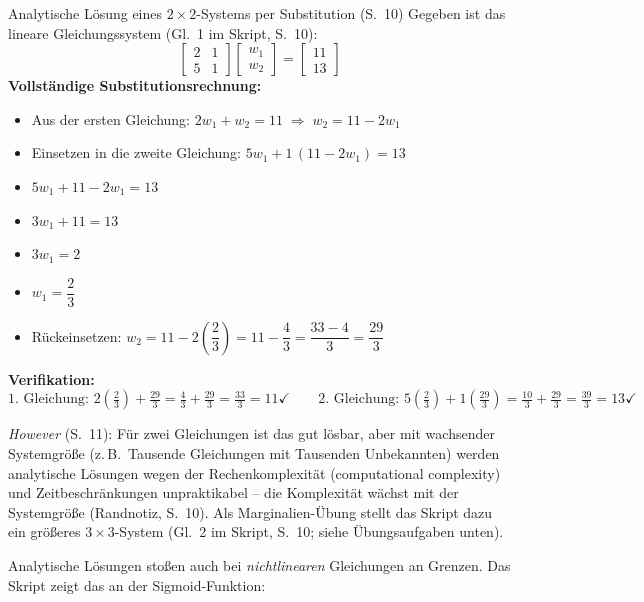 \begin{bspbox}{Analytische Lösung eines $2\times 2$-Systems per Substitution (S.~10)}
Gegeben ist das lineare Gleichungssystem (Gl.~1 im Skript, S.~10):
\[
\begin{bmatrix} 2 & 1 \\ 5 & 1 \end{bmatrix}
\begin{bmatrix} w_1 \\ w_2 \end{bmatrix}
=
\begin{bmatrix} 11 \\ 13 \end{bmatrix}
\]
\textbf{Vollständige Substitutionsrechnung:}
\begin{itemize}[itemsep=0pt]
  \item Aus der ersten Gleichung: $2w_1 + w_2 = 11 \;\Rightarrow\; w_2 = 11 - 2w_1$
  \item Einsetzen in die zweite Gleichung: $5w_1 + 1\,(11 - 2w_1) = 13$
  \item $5w_1 + 11 - 2w_1 = 13$
  \item $3w_1 + 11 = 13$
  \item $3w_1 = 2$
  \item $w_1 = \dfrac{2}{3}$
  \item Rückeinsetzen: $w_2 = 11 - 2\left(\dfrac{2}{3}\right) = 11 - \dfrac{4}{3} = \dfrac{33-4}{3} = \dfrac{29}{3}$
\end{itemize}
\textbf{Verifikation:}
\[
\text{1.\ Gleichung: } 2\left(\tfrac{2}{3}\right) + \tfrac{29}{3} = \tfrac{4}{3} + \tfrac{29}{3} = \tfrac{33}{3} = 11 \checkmark
\qquad
\text{2.\ Gleichung: } 5\left(\tfrac{2}{3}\right) + 1\left(\tfrac{29}{3}\right) = \tfrac{10}{3} + \tfrac{29}{3} = \tfrac{39}{3} = 13 \checkmark
\]
\end{bspbox}

\emph{However} (S.~11): Für zwei Gleichungen ist das gut lösbar, aber mit wachsender Systemgröße (z.\,B.\ Tausende Gleichungen mit Tausenden Unbekannten) werden analytische Lösungen wegen der Rechenkomplexität (computational complexity) und Zeitbeschränkungen unpraktikabel -- die Komplexität wächst mit der Systemgröße (Randnotiz, S.~10). Als Marginalien-Übung stellt das Skript dazu ein größeres $3\times 3$-System (Gl.~2 im Skript, S.~10; siehe Übungsaufgaben unten).

Analytische Lösungen stoßen auch bei \emph{nichtlinearen} Gleichungen an Grenzen. Das Skript zeigt das an der Sigmoid-Funktion:

